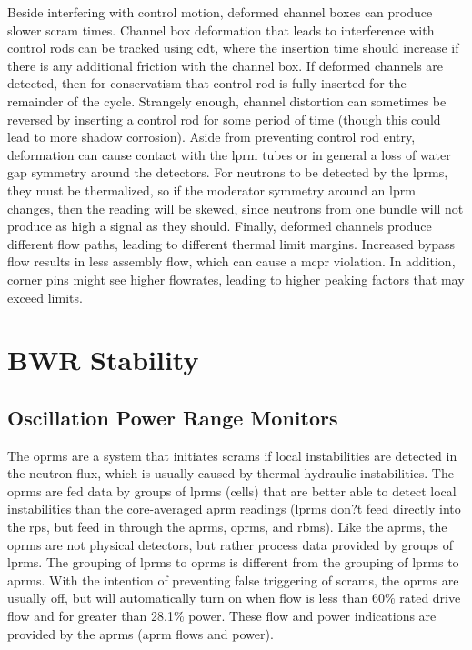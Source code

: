 \documentclass[10pt]{article}
\begin{document}
Beside interfering with control motion, deformed channel boxes can produce slower scram times. Channel box deformation that leads to interference with control rods can be tracked using \gls{cdt}, where the insertion time should increase if there is any additional friction with the channel box. If deformed channels are detected, then for conservatism that control rod is fully inserted for the remainder of the cycle. Strangely enough, channel distortion can sometimes be reversed by inserting a control rod for some period of time (though this could lead to more shadow corrosion). Aside from preventing control rod entry, deformation can cause contact with the \gls{lprm} tubes or in general a loss of water gap symmetry around the detectors. For neutrons to be detected by the \gls{lprm}s, they must be thermalized, so if the moderator symmetry around an \gls{lprm} changes, then the reading will be skewed, since neutrons from one bundle will not produce as high a signal as they should. Finally, deformed channels produce different flow paths, leading to different thermal limit margins. Increased bypass flow results in less assembly flow, which can cause a \gls{mcpr} violation. In addition, corner pins might see higher flowrates, leading to higher peaking factors that may exceed limits. 

\section{BWR Stability}

\subsection{Oscillation Power Range Monitors}
The \gls{oprm}s are a system that initiates scrams if local instabilities are detected in the neutron flux, which is usually caused by thermal-hydraulic instabilities. The \gls{oprm}s are fed data by groups of \gls{lprm}s (cells) that are better able to detect local instabilities than the core-averaged \gls{aprm} readings (\gls{lprm}s don?t feed directly into the \gls{rps}, but feed in through the \gls{aprm}s, \gls{oprm}s, and \gls{rbm}s). Like the \gls{aprm}s, the \gls{oprm}s are not physical detectors, but rather process data provided by groups of \gls{lprm}s. The grouping of \gls{lprm}s to \gls{oprm}s is different from the grouping of \gls{lprm}s to \gls{aprm}s. With the intention of preventing false triggering of scrams, the \gls{oprm}s are usually off, but will automatically turn on when flow is less than 60\% rated drive flow and for greater than 28.1\% power. These flow and power indications are provided by the \gls{aprm}s (\gls{aprm} flows and power). 
\end{document}
